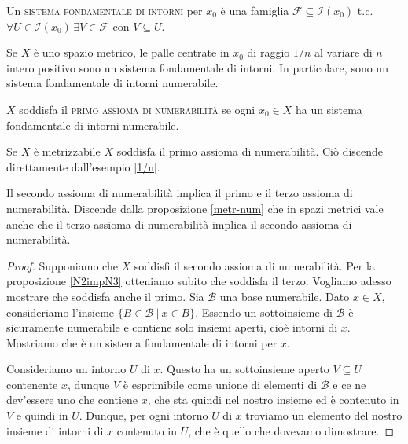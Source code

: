 \begin{defn}
	Un \textsc{sistema fondamentale di intorni} per $x_0$ è una famiglia
	$\mathcal{F} \subseteq \mathcal{I}(x_0)$ t.c. $\forall U \in
	\mathcal{I}(x_0) \, \exists V \in \mathcal{F}$ con $V \subseteq U$.
\end{defn}

\begin{ex} \label{1/n}
	Se $X$ è uno spazio metrico, le palle centrate in $x_0$ di raggio $1/n$ al
	variare di $n$ intero positivo sono un sistema fondamentale di intorni. In
	particolare, sono un sistema fondamentale di intorni numerabile.
\end{ex}

\begin{defn} \label{N1}
	$X$ soddisfa il \textsc{primo assioma di numerabilità} se ogni $x_0 \in X$
	ha un sistema fondamentale di intorni numerabile.
\end{defn}

\begin{ftt} \label{metr-N1}
	Se $X$ è metrizzabile $X$ soddisfa il primo assioma di numerabilità. Ciò
	discende direttamente dall'esempio \ref{1/n}.
\end{ftt}

\begin{prop} \label{N2power}
	Il secondo assioma di numerabilità implica il primo e il terzo assioma di
	numerabilità. Discende dalla proposizione \ref{metr-num} che in spazi
	metrici vale anche che il terzo assioma di numerabilità implica il secondo
	assioma di numerabilità.
\end{prop}

\begin{proof}
	Supponiamo che $X$ soddisfi il secondo assioma di numerabilità. Per la
	proposizione \ref{N2impN3} otteniamo subito che soddisfa il terzo. Vogliamo
	adesso mostrare che soddisfa anche il primo. Sia $\mathcal{B}$ una base
	numerabile. Dato $x \in X$, consideriamo l'insieme ${\{ B \in \mathcal{B}\
	|\ x \in B \}}$. Essendo un sottoinsieme di $\mathcal{B}$ è sicuramente
	numerabile e contiene solo insiemi aperti, cioè intorni di $x$. Mostriamo
	che è un sistema fondamentale di intorni per $x$.

	Consideriamo un intorno $U$ di $x$. Questo ha un sottoinsieme aperto $V
	\subseteq U$ contenente $x$, dunque $V$ è esprimibile come unione di
	elementi di $\mathcal{B}$ e ce ne dev'essere uno che contiene $x$, che sta
	quindi nel nostro insieme ed è contenuto in $V$ e quindi in $U$. Dunque, per
	ogni intorno $U$ di $x$ troviamo un elemento del nostro insieme di intorni
	di $x$ contenuto in $U$, che è quello che dovevamo dimostrare.
\end{proof}

